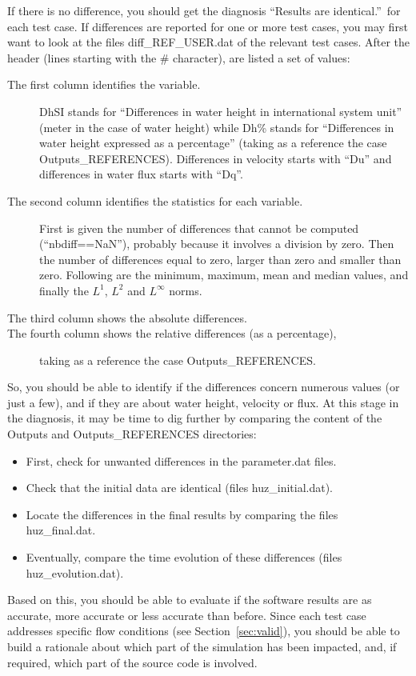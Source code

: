 \documentclass[a4paper, 11pt]{article}
\begin{document}
If there is no difference, you should get the diagnosis ``Results are identical.''\ for each test case.
If differences are reported for one or more test cases, you may first want to look at the files \textsf{diff\_REF\_USER.dat} of the relevant test cases.
After the header (lines starting with the \# character), are listed a set of values:
\begin{description}
	\item[The first column identifies the variable.
	      ] DhSI stands for ``Differences in water height in international system unit'' (meter in the case of water height) while Dh\% stands for ``Differences in water height expressed as a percentage'' (taking as a reference the case Outputs\_REFERENCES).
	      Differences in velocity starts with ``Du'' and differences in water flux starts with ``Dq''.
	\item[The second column identifies the statistics for each variable.] First is given the number of differences that cannot be computed (``nbdiff==NaN''), probably because it involves a division by zero.
	      Then the number of differences equal to zero, larger than zero and smaller than zero.
	      Following are the minimum, maximum, mean and median values, and finally the \(L^1\), \(L^2\) and \(L^\infty\) norms.
	\item[The third column shows the absolute differences.]
	\item[The fourth column shows the relative differences (as a percentage),] taking as a reference the case Outputs\_REFERENCES\@.
\end{description}
So, you should be able to identify if the differences concern numerous values (or just a few), and if they are about water height, velocity or flux.
At this stage in the diagnosis, it may be time to dig further by comparing the content of the \textsf{Outputs} and \textsf{Outputs\_REFERENCES} directories:
\begin{itemize}
	\item First, check for unwanted differences in the \textsf{parameter.dat} files.
	\item Check that the initial data are identical (files \textsf{huz\_initial.dat}).
	\item Locate the differences in the final results by comparing the files \textsf{huz\_final.dat}.
	\item Eventually, compare the time evolution of these differences (files \textsf{huz\_evolution.dat}).
\end{itemize}
Based on this, you should be able to evaluate if the software results are as accurate, more accurate or less accurate than before.
Since each test case addresses specific flow conditions (see Section~\ref{sec:valid}), you should be able to build a rationale about which part of the simulation has been impacted, and, if required, which part of the source code is involved.
\end{document}
